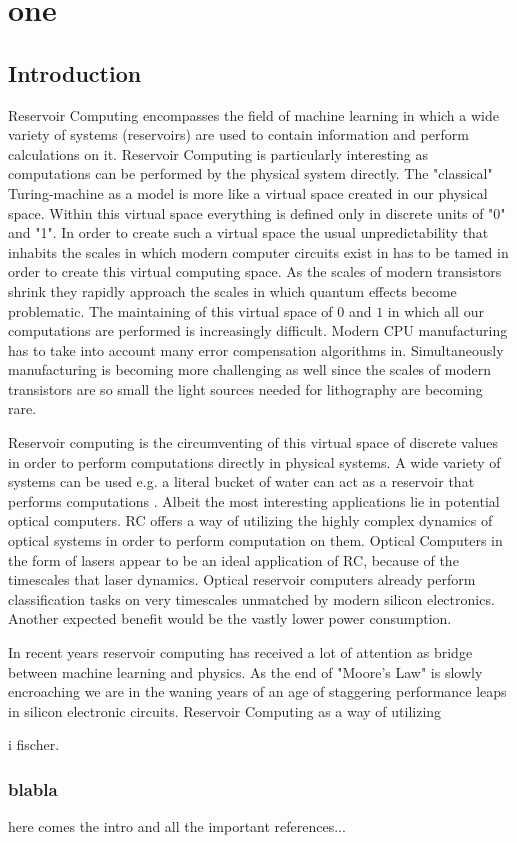 \chapter{one}

\section{Introduction}

	Reservoir Computing encompasses the field of machine learning in which a wide variety of systems (reservoirs) are used to contain information and perform calculations on it. Reservoir Computing is particularly interesting as computations can be performed by the physical system directly. The "classical" Turing-machine as a model is more like a virtual space created in our physical space. Within this virtual space everything is defined only in discrete units of "0" and "1". In order to create such a virtual space the usual unpredictability that inhabits the scales in which modern computer circuits exist in has to be tamed in order to create this virtual computing space. As the scales of modern transistors shrink they rapidly approach the scales in which quantum effects become problematic. The maintaining of this virtual space of $0$ and $1$ in which all our computations are performed is increasingly difficult. Modern CPU manufacturing has to take into account many error compensation algorithms in. Simultaneously manufacturing is becoming more challenging as well since the scales of modern transistors are so small the light sources needed for lithography are becoming rare.
	
	Reservoir computing is the circumventing of this virtual space of discrete values in order to perform computations directly in physical systems. A wide variety of systems can be used e.g. a literal bucket of water can act as a reservoir that performs computations \cite{FER03}. Albeit the most interesting applications lie in potential optical computers. RC offers a way of utilizing the highly complex dynamics of optical systems in order to perform computation on them. Optical Computers in the form of lasers appear to be an ideal application of RC, because of the timescales that laser dynamics. Optical reservoir computers already perform classification tasks on very timescales unmatched by modern silicon electronics.
	Another expected benefit would be the vastly lower power consumption.  
	

	In recent years reservoir computing has received a lot of attention as bridge between machine learning and physics. As the end of "Moore's Law" is slowly encroaching we are in the waning years of an age of staggering performance leaps in silicon electronic circuits. Reservoir Computing as a way of utilizing 
	
	\cite{SAN17a}

	\cite{LAR12} i fischer.


\subsection{blabla}

here comes the intro and all the important references...
